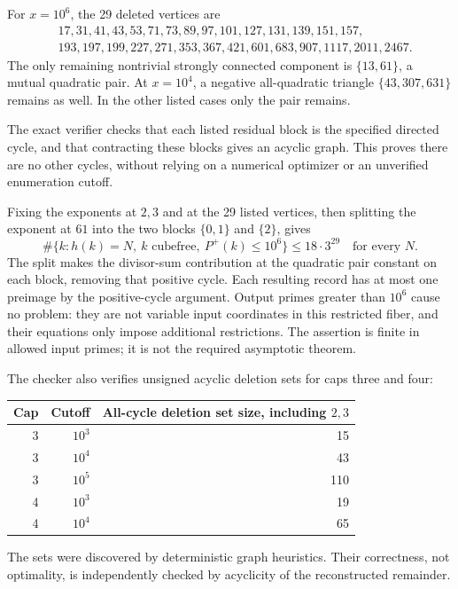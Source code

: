 \documentclass[11pt]{article}
\begin{document}
For $x=10^6$, the 29 deleted vertices are
\begin{align*}
&17,31,41,43,53,71,73,89,97,101,127,131,139,151,157,\\
&193,197,199,227,271,353,367,421,601,683,907,1117,2011,2467.
\end{align*}
The only remaining nontrivial strongly connected component is $\{13,61\}$, a mutual quadratic pair. At $x=10^4$, a negative all-quadratic triangle $\{43,307,631\}$ remains as well. In the other listed cases only the pair remains.

The exact verifier checks that each listed residual block is the specified directed cycle, and that contracting these blocks gives an acyclic graph. This proves there are no other cycles, without relying on a numerical optimizer or an unverified enumeration cutoff.

Fixing the exponents at $2,3$ and at the 29 listed vertices, then splitting the exponent at $61$ into the two blocks $\{0,1\}$ and $\{2\}$, gives
\begin{equation}\label{eq:finiteuniversal}
 \boxed{\#\{k:h(k)=N,\ k\text{ cubefree},\ P^+(k)\le10^6\}
 \le18\cdot3^{29}\quad\text{for every }N.}
\end{equation}
The split makes the divisor-sum contribution at the quadratic pair constant on each block, removing that positive cycle. Each resulting record has at most one preimage by the positive-cycle argument. Output primes greater than $10^6$ cause no problem: they are not variable input coordinates in this restricted fiber, and their equations only impose additional restrictions. The assertion is finite in allowed input primes; it is not the required asymptotic theorem.

The checker also verifies unsigned acyclic deletion sets for caps three and four:
\begin{center}
\begin{tabular}{@{}rrr@{}}\toprule
Cap & Cutoff & All-cycle deletion set size, including $2,3$\\\midrule
3 & $10^3$ & 15\\
3 & $10^4$ & 43\\
3 & $10^5$ & 110\\
4 & $10^3$ & 19\\
4 & $10^4$ & 65\\\bottomrule
\end{tabular}
\end{center}
The sets were discovered by deterministic graph heuristics. Their correctness, not optimality, is independently checked by acyclicity of the reconstructed remainder.
\end{document}
